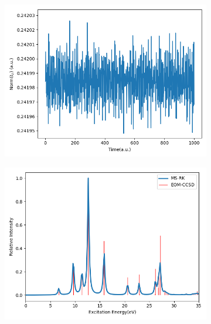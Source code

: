 \begin{figure}
\begin{subfigure}{0.475\textwidth}
        \includegraphics[width=\textwidth]{ch3/Figs/4-6.png}
    \end{subfigure}
    \hfill
    \begin{subfigure}{0.475\textwidth}
        \centering
        \includegraphics[width=\textwidth]{ch3/Figs/4-7.png}
    \end{subfigure}
    \\
    \begin{subfigure}{0.475\textwidth}
        \centering

\end{subfigure}
\end{figure}
